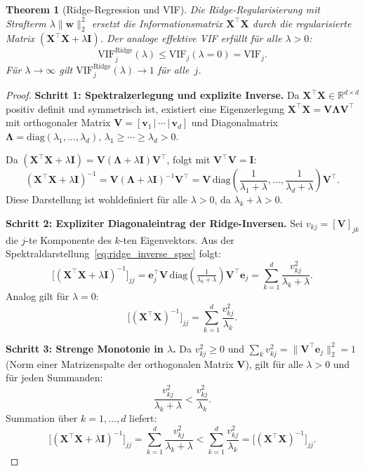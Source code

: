 ﻿\documentclass[12pt, a4paper]{article}
\newtheorem{theorem}{Theorem}[section]
\theoremstyle{definition}
\theoremstyle{remark}
\newcommand{\R}{\mathbb{R}}
\newcommand{\vw}{\bm{w}}
\newcommand{\vX}{\bm{X}}
\newcommand{\T}{\top}
\newcommand{\diag}{\mathrm{diag}}
\begin{document}
\begin{theorem}[Ridge-Regression und VIF]
	\label{thm:ridge_vif}
	Die Ridge-Regularisierung mit Strafterm $\lambda\|\vw\|_2^2$ ersetzt die Informationsmatrix
	$\vX^\T\vX$ durch die regularisierte Matrix $(\vX^\T\vX + \lambda\bm{I})$. Der analoge
	effektive VIF erfüllt für alle $\lambda > 0$:
	\begin{equation}
		\mathrm{VIF}_j^{\mathrm{Ridge}}(\lambda) \leq \mathrm{VIF}_j(\lambda=0) = \mathrm{VIF}_j.
		\label{eq:vif_ridge}
	\end{equation}
	Für $\lambda \to \infty$ gilt $\mathrm{VIF}_j^{\mathrm{Ridge}}(\lambda) \to 1$ für alle~$j$.
\end{theorem}

\begin{proof}
	\textbf{Schritt 1: Spektralzerlegung und explizite Inverse.}
	Da $\vX^\T\vX \in \R^{d\times d}$ positiv definit und symmetrisch ist, existiert eine
	Eigenzerlegung $\vX^\T\vX = \bm{V}\bm{\Lambda}\bm{V}^\T$ mit orthogonaler Matrix
	$\bm{V} = [\bm{v}_1\,|\,\cdots\,|\,\bm{v}_d]$ und Diagonalmatrix
	$\bm{\Lambda} = \diag(\lambda_1, \ldots, \lambda_d)$, $\lambda_1 \geq \cdots \geq \lambda_d > 0$.
	
	Da $(\vX^\T\vX + \lambda\bm{I}) = \bm{V}(\bm{\Lambda}+\lambda\bm{I})\bm{V}^\T$, folgt mit
	$\bm{V}^\T\bm{V} = \bm{I}$:
	\begin{equation}
		(\vX^\T\vX + \lambda\bm{I})^{-1}
		= \bm{V}(\bm{\Lambda}+\lambda\bm{I})^{-1}\bm{V}^\T
		= \bm{V}\,\diag\!\left(\frac{1}{\lambda_1+\lambda}, \ldots, \frac{1}{\lambda_d+\lambda}\right)\bm{V}^\T.
		\label{eq:ridge_inverse_spec}
	\end{equation}
	Diese Darstellung ist wohldefiniert für alle $\lambda > 0$, da $\lambda_k + \lambda > 0$.
	
	\textbf{Schritt 2: Expliziter Diagonaleintrag der Ridge-Inversen.}
	Sei $v_{kj} = [\bm{V}]_{jk}$ die $j$-te Komponente des $k$-ten Eigenvektors. Aus der
	Spektraldarstellung~\eqref{eq:ridge_inverse_spec} folgt:
	\[
	\bigl[(\vX^\T\vX + \lambda\bm{I})^{-1}\bigr]_{jj}
	= \bm{e}_j^\T\bm{V}\,\diag\!\left(\tfrac{1}{\lambda_k+\lambda}\right)\bm{V}^\T\bm{e}_j
	= \sum_{k=1}^{d} \frac{v_{kj}^2}{\lambda_k + \lambda}.
	\]
	Analog gilt für $\lambda = 0$:
	\[
	\bigl[(\vX^\T\vX)^{-1}\bigr]_{jj} = \sum_{k=1}^{d} \frac{v_{kj}^2}{\lambda_k}.
	\]
	
	\textbf{Schritt 3: Strenge Monotonie in $\lambda$.}
	Da $v_{kj}^2 \geq 0$ und $\sum_k v_{kj}^2 = \|\bm{V}^\T\bm{e}_j\|_2^2 = 1$ (Norm einer
	Matrizenspalte der orthogonalen Matrix $\bm{V}$), gilt für alle $\lambda > 0$ und für jeden Summanden:
	\[
	\frac{v_{kj}^2}{\lambda_k + \lambda} < \frac{v_{kj}^2}{\lambda_k}.
	\]
	Summation über $k = 1, \ldots, d$ liefert:
	\[
	\bigl[(\vX^\T\vX + \lambda\bm{I})^{-1}\bigr]_{jj}
	= \sum_{k=1}^d \frac{v_{kj}^2}{\lambda_k+\lambda}
	< \sum_{k=1}^d \frac{v_{kj}^2}{\lambda_k}
	= \bigl[(\vX^\T\vX)^{-1}\bigr]_{jj}.
	\]
	

\end{proof}
\end{document}
